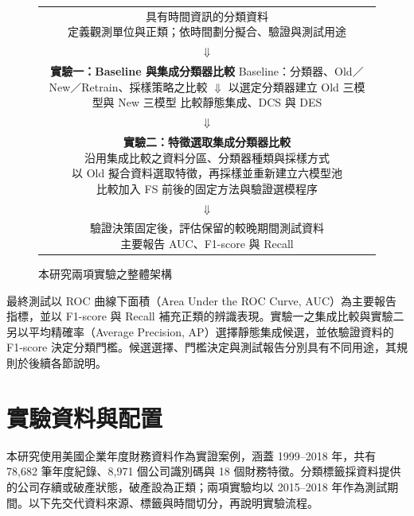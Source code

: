 \begin{figure}[htbp]
\centering
\begingroup
\small
{}
\setlength{\fboxsep}{8pt}
\begin{tabular}{@{}c@{}}
\fbox{\parbox{0.88\linewidth}{\centering 具有時間資訊的分類資料\\
定義觀測單位與正類；依時間劃分擬合、驗證與測試用途}}\\[3pt]
\(\Downarrow\)\\[3pt]
\fbox{\parbox{0.88\linewidth}{\centering\textbf{實驗一：Baseline 與集成分類器比較}\\[4pt]
Baseline：分類器、Old／New／Retrain、採樣策略之比較\\
\(\Downarrow\)\\
以選定分類器建立 Old 三模型與 New 三模型\\
比較靜態集成、DCS 與 DES}}\\[3pt]
\(\Downarrow\)\\[3pt]
\fbox{\parbox{0.88\linewidth}{\centering\textbf{實驗二：特徵選取集成分類器比較}\\[4pt]
沿用集成比較之資料分區、分類器種類與採樣方式\\
以 Old 擬合資料選取特徵，再採樣並重新建立六模型池\\
比較加入 FS 前後的固定方法與驗證選模程序}}\\[3pt]
\(\Downarrow\)\\[3pt]
\fbox{\parbox{0.88\linewidth}{\centering 驗證決策固定後，評估保留的較晚期間測試資料\\
主要報告 AUC、F1-score 與 Recall}}
\end{tabular}
\endgroup
\caption{本研究兩項實驗之整體架構}\label{fig:method-overview}
\par{}
\end{figure}

最終測試以 ROC 曲線下面積（Area Under the ROC Curve, AUC）為主要報告指標，並以 F1-score 與 Recall 補充正類的辨識表現。實驗一之集成比較與實驗二另以平均精確率（Average Precision, AP）選擇靜態集成候選，並依驗證資料的 F1-score 決定分類門檻。候選選擇、門檻決定與測試報告分別具有不同用途，其規則於後續各節說明。

\clearpage
\section{實驗資料與配置}\label{sec:method-data}

本研究使用美國企業年度財務資料作為實證案例，涵蓋 1999--2018 年，共有 78,682 筆年度紀錄、8,971 個公司識別碼與 18 個財務特徵。分類標籤採資料提供的公司存續或破產狀態，破產設為正類；兩項實驗均以 2015--2018 年作為測試期間。以下先交代資料來源、標籤與時間切分，再說明實驗流程。


